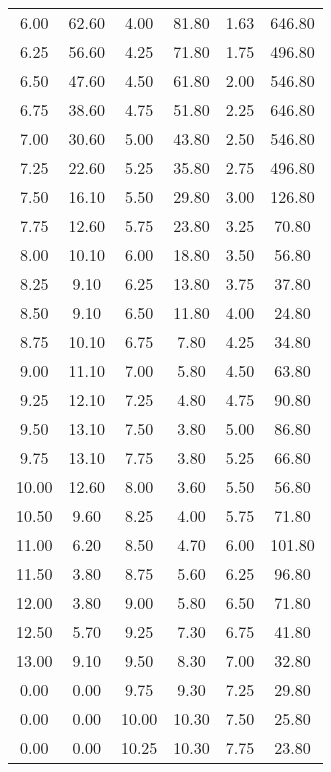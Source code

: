 \begin{longtable}{S[table-format=3.2] S[table-format=3.2] S[table-format=3.2] S[table-format=3.2] S[table-format=3.2] S[table-format=3.2]}
                6.00 & 62.60 & 4.00 & 81.80 & 1.63 & 646.80\\
                6.25 & 56.60 & 4.25 & 71.80 & 1.75 & 496.80\\
                6.50 & 47.60 & 4.50 & 61.80 & 2.00 & 546.80\\
                6.75 & 38.60 & 4.75 & 51.80 & 2.25 & 646.80\\
                7.00 & 30.60 & 5.00 & 43.80 & 2.50 & 546.80\\
                7.25 & 22.60 & 5.25 & 35.80 & 2.75 & 496.80\\
                7.50 & 16.10 & 5.50 & 29.80 & 3.00 & 126.80\\
                7.75 & 12.60 & 5.75 & 23.80 & 3.25 & 70.80\\
                8.00 & 10.10 & 6.00 & 18.80 & 3.50 & 56.80\\
                8.25 & 9.10 & 6.25 & 13.80 & 3.75 & 37.80\\
                8.50 & 9.10 & 6.50 & 11.80 & 4.00 & 24.80\\
                8.75 & 10.10 & 6.75 & 7.80 & 4.25 & 34.80\\
                9.00 & 11.10 & 7.00 & 5.80 & 4.50 & 63.80\\
                9.25 & 12.10 & 7.25 & 4.80 & 4.75 & 90.80\\
                9.50 & 13.10 & 7.50 & 3.80 & 5.00 & 86.80\\
                9.75 & 13.10 & 7.75 & 3.80 & 5.25 & 66.80\\
                10.00 & 12.60 & 8.00 & 3.60 & 5.50 & 56.80\\
                10.50 & 9.60 & 8.25 & 4.00 & 5.75 & 71.80\\
                11.00 & 6.20 & 8.50 & 4.70 & 6.00 & 101.80\\
                11.50 & 3.80 & 8.75 & 5.60 & 6.25 & 96.80\\
                12.00 & 3.80 & 9.00 & 5.80 & 6.50 & 71.80\\
                12.50 & 5.70 & 9.25 & 7.30 & 6.75 & 41.80\\
                13.00 & 9.10 & 9.50 & 8.30 & 7.00 & 32.80\\
                0.00 & 0.00 & 9.75 & 9.30 & 7.25 & 29.80\\
                0.00 & 0.00 & 10.00 & 10.30 & 7.50 & 25.80\\
                0.00 & 0.00 & 10.25 & 10.30 & 7.75 & 23.80\\

\end{longtable}
